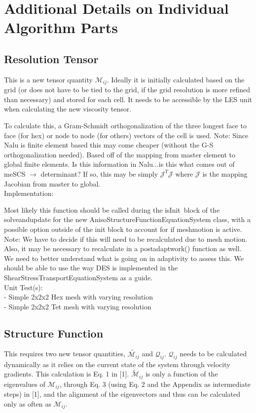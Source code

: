 \documentclass[12pt]{article}
\begin{document}
\section{Additional Details on Individual Algorithm Parts}


\subsection{Resolution Tensor}
\label{sec:resten}
This is a new tensor quantity $\mathcal{M}_{ij}$.  Ideally it is initially calculated based on the grid (or does not have to be tied to the grid, if the grid resolution is more refined than necessary) and stored for each cell.  It needs to be accessible by the LES unit when calculating the new viscosity tensor.

To calculate this, a Gram-Schmidt orthogonalization of the three longest face to face (for hex) or node to node (for others) vectors of the cell is used.  Note: Since Nalu is finite element based this may come cheaper (without the G-S orthogonalization needed).  Based off of the mapping from master element to global finite elements.  Is this information in Nalu...is this what comes out of meSCS $\rightarrow$ determinant?  If so, this may be simply $\mathcal{J}^T\mathcal{J}$ where $\mathcal{J}$ is the mapping Jacobian from master to global. \\

\noindent Implementation:

Most likely this function should be called during the isInit\textunderscore \ block of the solve\textunderscore and\textunderscore update for the new AnisoStructureFunctionEquationSystem class, with a possible option outside of the init block to account for if mesh\textunderscore motion is active.  Note: We have to decide if this will need to be recalculated due to mesh motion.  Also, it may be necessary to recalculate in a post\textunderscore adapt\textunderscore work() function as well. We need to better understand what is going on in adaptivity to assess this.  We should be able to use the way DES is implemented in the ShearStressTransportEquationSystem as a guide. \\

\noindent Unit Test(s): \\
- Simple 2x2x2 Hex mesh with varying resolution \\
- Simple 2x2x2 Tet mesh with varying resolution



\subsection{Structure Function}
\label{sec:strfxn}
This requires two new tensor quantities, $\tilde{\mathcal{M}_{ij}}$ and $\mathcal{Q}_{ij}$.  $\mathcal{Q}_{ij}$ needs to be calculated dynamically as it relies on the current state of the system through velocity gradients.  This calculation is Eq. 1 in [1]. $\tilde{\mathcal{M}}_{ij}$ is only a function of the eigenvalues of $\mathcal{M}_{ij}$, through Eq. 3 (using Eq. 2 and the Appendix as intermediate steps) in [1], and the alignment of the eigenvectors and thus can be calculated only as often as $\mathcal{M}_{ij}$. \\
\end{document}
